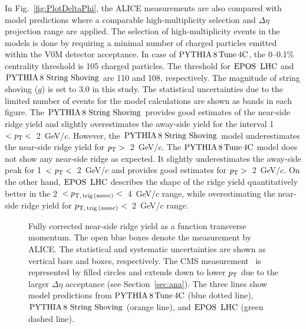In Fig.~\ref{fig:PlotDeltaPhi}, the ALICE measurements are also compared with model predictions where a comparable high-multiplicity selection and $\Delta\eta$ projection range are applied. The selection of high-multiplicity events in the models is done by requiring a minimal number of charged particles emitted within the V0M detector acceptance. In case of $\mathrm{PYTHIA}\,8\,\mathrm{Tune\,4C}$, the 0--0.1\% centrality threshold is 105 charged particles. The threshold for ${\mathrm{EPOS}\,~\mathrm{LHC}}$ and ${\mathrm{PYTHIA}\,8~\mathrm{String}~}\mathrm{Shoving}$ are 110 and 108, respectively. The magnitude of string shoving ($g$) is set to 3.0 in this study. The statistical uncertainties due to the limited number of events for the model calculations are shown as bands in each figure. The ${\mathrm{PYTHIA}\,8~\mathrm{String}~}\mathrm{Shoving}$ provides good estimates of the near-side ridge yield and slightly overestimates the away-side yield for the interval 1~$<\it{p}_{\rm{T}}<$~2~GeV/$c$. However, the ${\mathrm{PYTHIA}\,8~\mathrm{String}~}\mathrm{Shoving}$ model underestimates the near-side ridge yield for $\it{p}_{\rm{T}}>$~2~GeV/$c$. The $\mathrm{PYTHIA}\,8\,\mathrm{Tune\,4C}$ model does not show any near-side ridge as expected. It slightly underestimates the away-side peak for 1~$<\it{p}_{\rm{T}}<$~2~GeV/$c$ and provides good estimates for $\it{p}_{\rm{T}}>$~2~GeV/$c$. On the other hand, ${\mathrm{EPOS}\,~\mathrm{LHC}}$ describes the shape of the ridge yield quantitatively better in the 2~$<p_\mathrm{T,\,trig\,(assoc)}<$~4~GeV/$c$ range, while overestimating the near-side ridge yield for $p_\mathrm{T,\,trig\,(assoc)}<$~2~GeV/$c$ range. 


\begin{figure}[h!]
	\centering
	\caption{ Fully corrected near-side ridge yield as a function transverse momentum. The open blue boxes denote the measurement by ALICE. The statistical and systematic uncertainties are shown as vertical bars and boxes, respectively. The CMS measurement~\cite{Khachatryan:2015lva} is represented by filled circles and extends down to lower $p_\mathrm{T}$ due to the larger $\Delta\eta$ acceptance (see Section~\ref{sec:ana}). The three lines show model predictions from $\mathrm{PYTHIA}\,8\,\mathrm{Tune\,4C}$ (blue dotted line), ${\mathrm{PYTHIA}\,8~\mathrm{String}~}\mathrm{Shoving}$ (orange line), and ${\mathrm{EPOS}\,~\mathrm{LHC}}$ (green dashed line).}
	\label{fig:PlotYSpect}
\end{figure}

